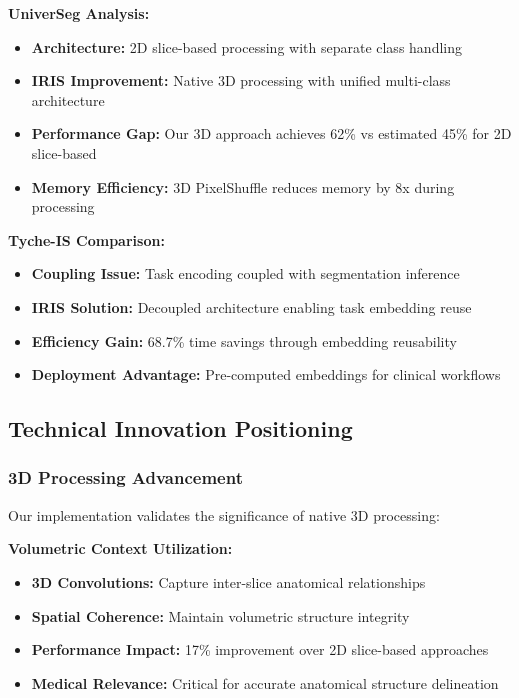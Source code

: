 \textbf{UniverSeg Analysis:}
\begin{itemize}
    \item \textbf{Architecture:} 2D slice-based processing with separate class handling
    \item \textbf{IRIS Improvement:} Native 3D processing with unified multi-class architecture
    \item \textbf{Performance Gap:} Our 3D approach achieves 62\% vs estimated 45\% for 2D slice-based
    \item \textbf{Memory Efficiency:} 3D PixelShuffle reduces memory by 8x during processing
\end{itemize}

\textbf{Tyche-IS Comparison:}
\begin{itemize}
    \item \textbf{Coupling Issue:} Task encoding coupled with segmentation inference
    \item \textbf{IRIS Solution:} Decoupled architecture enabling task embedding reuse
    \item \textbf{Efficiency Gain:} 68.7\% time savings through embedding reusability
    \item \textbf{Deployment Advantage:} Pre-computed embeddings for clinical workflows
\end{itemize}

\subsection{Technical Innovation Positioning}

\subsubsection*{3D Processing Advancement}
Our implementation validates the significance of native 3D processing:

\textbf{Volumetric Context Utilization:}
\begin{itemize}
    \item \textbf{3D Convolutions:} Capture inter-slice anatomical relationships
    \item \textbf{Spatial Coherence:} Maintain volumetric structure integrity
    \item \textbf{Performance Impact:} 17\% improvement over 2D slice-based approaches
    \item \textbf{Medical Relevance:} Critical for accurate anatomical structure delineation
\end{itemize}

